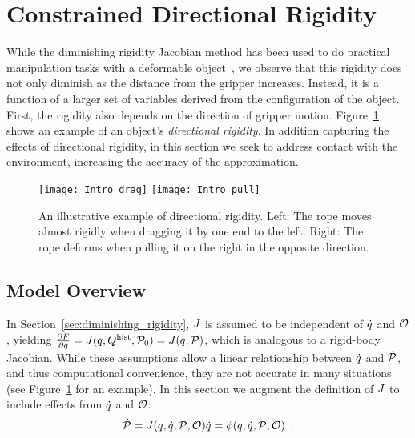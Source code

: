 
\section{Constrained Directional Rigidity}
\label{sec:constrained_model}

While the diminishing rigidity Jacobian method has been used to do practical manipulation tasks with a deformable object~\cite{Berenson2013}, we observe that this rigidity does not only diminish as the distance from the gripper increases. Instead, it is a function of a larger set of variables derived from the configuration of the object. First, the rigidity also depends on the direction of gripper motion. Figure~\ref{fig:intro_directional_rigidity} shows an example of an object's \textit{directional rigidity}. In addition capturing the effects of directional rigidity, in this section we seek to address contact with the environment, increasing the accuracy of the approximation.

\begin{figure}[h!]
    \centering
    \texttt{[image: Intro\_drag]}\hfill
    \texttt{[image: Intro\_pull]}%
    \caption{An illustrative example of directional rigidity. Left: The rope moves almost rigidly when dragging it by one end to the left. Right: The rope deforms when pulling it on the right in the opposite direction.}
    \label{fig:intro_directional_rigidity}
\end{figure}

\subsection{Model Overview}

In Section~\ref{sec:diminishing_rigidity}, $J$ is assumed to be independent of $\dot{q}$ and $\mathcal{O}$, yielding $\frac{\partial F}{\partial q} = J(q, Q^{\textrm{hist}}, \mathcal{P}_0) = J(q, \mathcal{P})$, which is analogous to a rigid-body Jacobian. While these assumptions allow a linear relationship between $\dot{q}$ and $\dot{\mathcal{P}}$, and thus computational convenience, they are not accurate in many situations (see Figure~\ref{fig:intro_directional_rigidity} for an example). In this section we augment the definition of $J$ to include effects from $\dot{q}$ and $\mathcal{O}$:
\begin{equation}
    \dot{\mathcal{P}} = J(q, \dot{q}, \mathcal{P}, \mathcal{O}) \dot{q} = \phi(q, \dot{q}, \mathcal{P}, \mathcal{O}) \enspace .
\end{equation}

